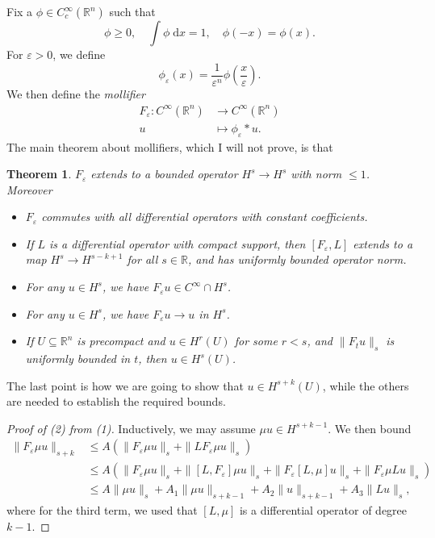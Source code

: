 \documentclass{shortart}
\newtheorem*{thm}{Theorem}
\theoremstyle{definition}
\newcommand\R{\mathbb{R}}
\newcommand\der{\mathrm{d}}
\begin{document}
Fix a $\phi \in C_c^\infty(\R^n)$ such that
\[
  \phi \geq 0,\quad \int \phi\;\der x = 1,\quad \phi(-x) = \phi(x).
\]
For $\varepsilon > 0$, we define
\[
  \phi_\varepsilon(x) = \frac{1}{\varepsilon^n} \phi\left(\frac{x}{\varepsilon}\right).
\]
We then define the \emph{mollifier}
\begin{align*}
  F_\varepsilon: C^\infty(\R^n) &\to C^\infty(\R^n)\\
  u &\mapsto \phi_\varepsilon * u.
\end{align*}
The main theorem about mollifiers, which I will not prove, is that
\begin{thm}
  $F_\varepsilon$ extends to a bounded operator $H^s \to H^s$ with norm $\leq 1$. Moreover
  \begin{itemize}
    \item $F_\varepsilon$ commutes with all differential operators with constant coefficients.
    \item If $L$ is a differential operator with compact support, then $[F_\varepsilon, L]$ extends to a map $H^s \to H^{s - k + 1}$ for all $s \in \R$, and has uniformly bounded operator norm.
    \item For any $u \in H^s$, we have $F_\varepsilon u \in C^\infty \cap H^s$.
    \item For any $u \in H^s$, we have $F_\varepsilon u \to u$ in $H^s$.
    \item If $U \subseteq \R^n$ is precompact and $u \in H^r(U)$ for some $r < s$, and $\|F_t u\|_s$ is uniformly bounded in $t$, then $u \in H^s(U)$.\fakeqed
  \end{itemize}
\end{thm}
The last point is how we are going to show that $u \in H^{s + k}(U)$, while the others are needed to establish the required bounds.

\begin{proof}[Proof of (2) from (1)]
  Inductively, we may assume $\mu u \in H^{s + k - 1}$. We then bound
  \begin{align*}
    \|F_\varepsilon \mu u\|_{s + k} &\leq A(\|F_\varepsilon \mu u\|_s + \|L F_\varepsilon \mu u\|_s)\\
    &\leq A(\|F_\varepsilon \mu u\|_s + \|[L, F_\varepsilon] \mu u\|_s + \|F_\varepsilon [L, \mu] u\|_s + \|F_\varepsilon \mu Lu\|_s)\\
    &\leq A\|\mu u\|_s + A_1 \|\mu u\|_{s + k - 1} + A_2\|u\|_{s + k - 1} + A_3 \|Lu\|_s,
  \end{align*}
  where for the third term, we used that $[L, \mu]$ is a differential operator of degree $k - 1$.
\end{proof}
\end{document}
